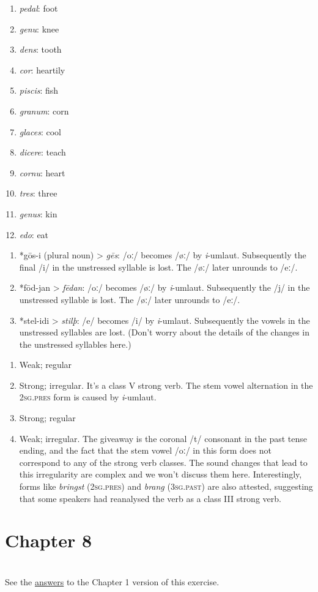 \newpage
\noindent\textbf{}
\begin{multicols}{3}
\begin{enumerate}
    \item \emph{pedal}: foot
    \item \emph{genu}: knee
    \item \emph{dens}: tooth
    \item \emph{cor}: heartily
    \item \emph{piscis}: fish
    \item \emph{granum}: corn
    \item \emph{glaces}: cool
    \item \emph{dicere}: teach
    \item \emph{cornu}: heart
    \item \emph{tres}: three
    \item \emph{genus}: kin
    \item \emph{edo}: eat
\end{enumerate}
\end{multicols}

\noindent\textbf{}
\begin{enumerate}
    \item *gōs-i (plural noun) > \emph{gēs}: /oː/ becomes /øː/ by \emph{i}-umlaut. Subsequently the final /i/ in the unstressed syllable is lost. The /øː/ later unrounds to /eː/. 
    \item *fōd-jan > \emph{fēdan}: /oː/ becomes /øː/ by \emph{i}-umlaut. Subsequently the /j/ in the unstressed syllable is lost. The /øː/ later unrounds to /eː/.
    \item *stel-idi > \emph{stilþ}: /e/ becomes /i/ by \emph{i}-umlaut. Subsequently the vowels in the unstressed syllables are lost. (Don't worry about the details of the changes in the unstressed syllables here.)
\end{enumerate}

\noindent\textbf{}
\begin{enumerate}
    \item Weak; regular
    \item Strong; irregular. It's a class V strong verb. The stem vowel alternation in the \textsc{2sg.pres} form is caused by \emph{i}-umlaut.
    \item Strong; regular
    \item Weak; irregular. The giveaway is the coronal /t/ consonant in the past tense ending, and the fact that the stem vowel /oː/ in this form does not correspond to any of the strong verb classes. The sound changes that lead to this irregularity are complex and we won't discuss them here. Interestingly, forms like \emph{bringst} (\textsc{2sg.pres}) and \emph{brang} (\textsc{3sg.past}) are also attested, suggesting that some speakers had reanalysed the verb as a class III strong verb.
\end{enumerate}

\section*{Chapter 8}

\noindent\textbf{}\\
See the \hyperref[sower-answers]{answers} to the Chapter 1 version of this exercise.

